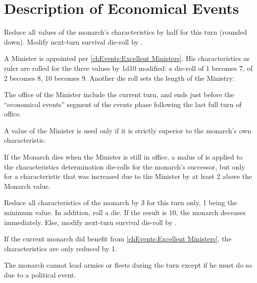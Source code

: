 \section{Description of Economical Events}




Reduce all values of the monarch's characteristics by half for this turn
(rounded down). Modify next-turn survival die-roll by .




\phevnt
\aparag A Minister is appointed per \ref{chEvents:Excellent Ministers}. His
characteristics as ruler are rolled for the three values by 1d10 modified: a
die-roll of 1 becomes 7, of 2 becomes 8, 10 becomes 9.  Another die roll sets
the length of the Ministry:


\aparag The office of the Minister include the current turn, and ends just
before the ``economical events'' segment of the events phase following the
last full turn of office.

\aparag A value of the Minister is used only if it is strictly superior to the
monarch's own characteristic.

\aparag If the Monarch dies when the Minister is still in office, a malus of
 is applied to the characteristics determination die-rolls for the
monarch's successor, but only for a characteristic that was increased due to
the Minister by at least 2 above the Monarch value.




Reduce all characteristics of the monarch by 3 for this turn only, 1 being the
minimum value. In addition, roll a die. If the result is 10, the monarch
deceases immediately. Else, modify next-turn survival die-roll by .

If the current monarch did benefit from \ref{chEvents:Excellent Ministers},
the characteristics are only reduced by 1.

The monarch cannot lead armies or fleets during the turn
except if he must do so due to a political event.



